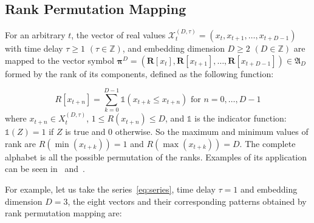 \subsection{Rank Permutation Mapping}\label{sub:rankPermutation}

For an arbitrary $t$, the vector of real values $\mathcal{X}^{(D, \tau)}_t = (x_t, x_{t + 1}, \dots, x_{t + D - 1})$ with time delay $\tau \geq 1$ $(\tau \in \mathbb{Z})$, and embedding dimension $D \geq 2$ $(D \in \mathbb{Z})$ are mapped to the vector symbol $\bm \pi^D = (\bm R[x_t], \bm R[x_{t + 1}], \dots, \bm R[x_{t + D - 1}]) \in {\mathfrak A}_{D}$ formed by the rank of its components, defined as the following function:

\begin{equation}
    R[x_{t + n}] = \sum^{D - 1}_ {k = 0} \mathds{1} (x_{t + k} \leq x_{t + n}) \text{ for } n = 0, \dots, D - 1
\end{equation}
where $x_{t+n} \in X^{(D, \tau)}_t$, $1 \leq R(x_{t+n}) \leq D$, and $\mathds{1}$ is the indicator function: $\mathds{1}(Z) = 1$ if $Z$ is true and $0$ otherwise.  
So the maximum and minimum values of rank are $R(\min(x_{t+k})) = 1$ and $R(\max(x_{t+k})) = D$.
The complete alphabet is all the possible permutation of the ranks.
Examples of its application can be seen in~\cite{riedl2013practical} and~\cite{bandt2007order}.

For example, let us take the series~\ref{eq:series}, time delay $\tau = 1$ and embedding dimension $D = 3$, the eight vectors and their corresponding patterns obtained by rank permutation mapping are:

